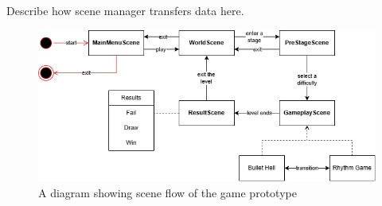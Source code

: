 \vspace{0.5cm}

Describe how scene manager transfers data here.

\vspace{0.5cm}

\begin{figure}[h]
    \centering
    \includegraphics[width=\columnwidth, keepaspectratio]{images/gameflow}
    \caption{A diagram showing scene flow of the game prototype}
    \label{fig:gameflow}
\end{figure}

\vspace{0.5cm}

